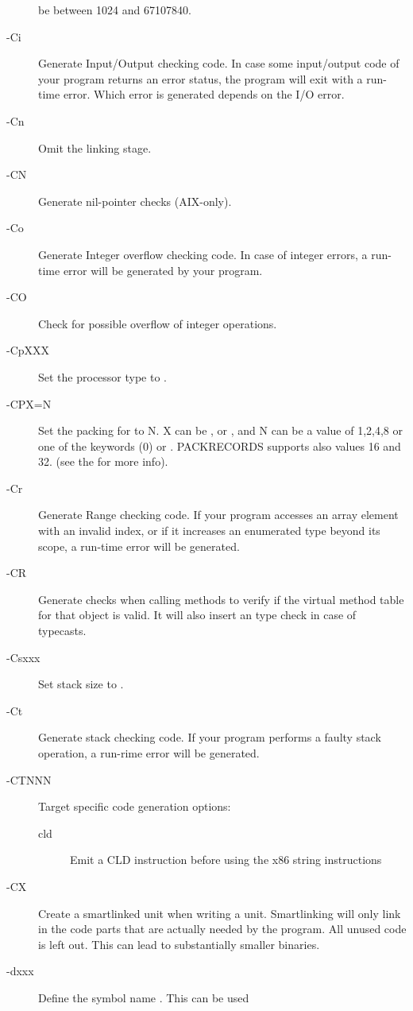 \begin{description}
be between 1024 and 67107840.
\item [-Ci]  Generate Input/Output checking code. In case some
input/output code of your program returns an error status, the program will
exit with a run-time error. Which error is generated depends on the I/O error.
\item [-Cn]  Omit the linking stage.
\item [-CN]  Generate nil-pointer checks (AIX-only).
\item [-Co]  Generate Integer overflow checking code. In case of
integer errors, a run-time error will be generated by your program.
\item [-CO]  Check for possible overflow of integer operations.
\item [-CpXXX] Set the processor type to .
\item [-CPX=N] Set the packing for  to N. X can be ,
 or , and N can be a value of 1,2,4,8 or one
of the keywords  (0) or . PACKRECORDS supports also
values 16 and 32.  (see the \progref for more info).
\item [-Cr]  Generate Range checking code. If your program
accesses an array element with an invalid index, or if it increases an
enumerated type beyond its scope, a run-time error will be generated.
\item [-CR]  Generate checks when calling methods to verify
if the virtual method table for that object is valid. It will also insert an type check in case of typecasts.
\item [-Csxxx]  Set stack size to .
\item [-Ct]  Generate stack checking code. If your program
performs a faulty stack operation, a run-rime error will be generated.
\item [-CTNNN]  Target specific code generation options:
\begin{description}
\item [cld]Emit a CLD instruction before using the x86 string instructions
\end{description}
\item [-CX]  Create a smartlinked unit when writing a unit.
Smartlinking will only link in the code parts that are actually needed by
the program. All unused code is left out. This can lead to substantially
smaller binaries.
\item [-dxxx]  Define the symbol name . This can be used

\end{description}
